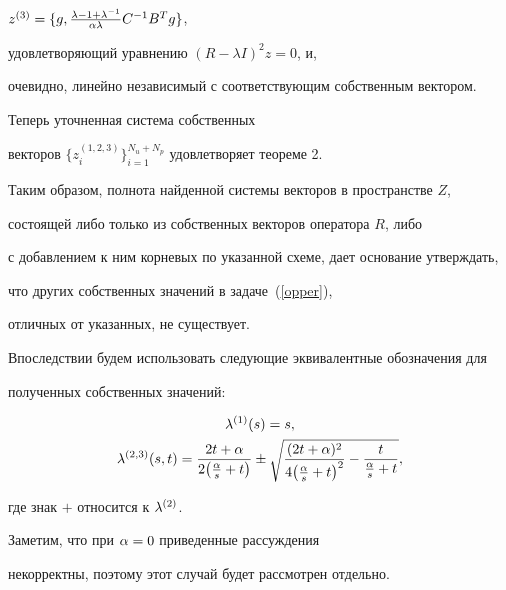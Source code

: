 \begin{pf}
$z^{(3)}=\{g, \frac{\lambda-1+\lambda^{-1}}{\alpha \lambda} C^{-1} B^T g\}$,


удовлетворяющий уравнению $(R-\lambda I)^2 z = 0$, и,


очевидно, линейно независимый с соответствующим собственным вектором.


Теперь уточненная система собственных


векторов $ \{z_i^{(1,2,3)}\}_{i=1}^{N_u+N_p} $ удовлетворяет теореме 2.





Таким образом, полнота найденной системы векторов в пространстве $Z$,


состоящей либо только из собственных векторов оператора $R$, либо


с добавлением к ним корневых по указанной схеме, дает основание утверждать,


что других собственных значений в задаче~(\ref{opper}), 


отличных от указанных, не существует.


\end{pf}





Впоследствии будем использовать следующие эквивалентные обозначения для 


полученных собственных значений:


\begin{gather}


\zl^{(1)}(s)= s,\notag \\


%


\label{equa7}


\zl^{(2,3)}(s,t) =


\dfrac{2t+\alpha}{2\big(\frac{\alpha}{s}+t\big)} \pm


\sqrt{ \frac{(2t+\alpha)^2}{4\big(\frac{\alpha}{s}+t\big)^2}-


\frac{t}{\frac{\alpha}{s}+t}} ,


\end{gather}


где знак $+$ относится к $\lambda^{(2)}$.





Заметим, что при $\alpha = 0$ приведенные рассуждения


некорректны, поэтому этот случай будет рассмотрен отдельно.








